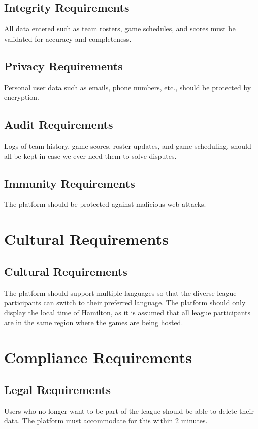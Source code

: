 \documentclass[12pt]{article}
\begin{document}
\subsection{Integrity Requirements}
All data entered such as team rosters, game schedules, and scores must be validated for accuracy and completeness.

\subsection{Privacy Requirements}
Personal user data such as emails, phone numbers, etc., should be protected by encryption.

\subsection{Audit Requirements}
Logs of team history, game scores, roster updates, and game scheduling, should all be kept in case we ever need them to solve disputes.

\subsection{Immunity Requirements}
The platform should be protected against malicious web attacks.

\section{Cultural Requirements}
\subsection{Cultural Requirements}
The platform should support multiple languages so that the diverse league participants can switch to their preferred language. The platform should only display the local time of Hamilton, as it is assumed that all league participants are in the same region where the games are being hosted.

\section{Compliance Requirements}
\subsection{Legal Requirements}
Users who no longer want to be part of the league should be able to delete their data. The platform must accommodate for this within 2 minutes.
\end{document}

